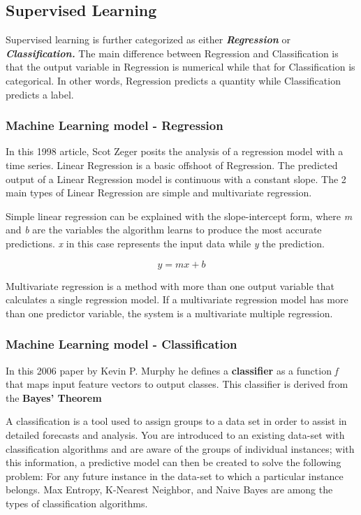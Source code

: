 \documentclass[
]{thesis-ekf}
\begin{document}
\subsection{Supervised Learning} %
Supervised learning is further categorized as  either \textbf{\textit{Regression}} or \textbf{\textit{Classification.}} The main difference between Regression and Classification is that the output variable in Regression is numerical while that for Classification is categorical. In other words, Regression predicts a quantity while  Classification predicts a label.


\subsubsection{Machine Learning model - Regression}
In this 1998 article, \cite{zeger1988regression} Scot Zeger posits the analysis of a regression model with a time series. Linear Regression is a basic offshoot of Regression. The predicted output of a Linear Regression model is continuous with a constant slope. The 2 main types of Linear Regression are simple and multivariate regression. 

Simple linear regression can be explained with the slope-intercept form, where \textit{m} and \textit{b} are the variables the algorithm learns to produce the most accurate predictions. \textit{x} in this case represents the input data while \textit{y} the prediction.

\begin{equation}
	y = m x + b
\end{equation}

Multivariate regression is a method with more than one output variable that calculates a single regression model. If a multivariate regression model has more than one predictor variable, the system is a multivariate multiple regression.


\subsubsection{Machine Learning model - Classification}

In this 2006 paper by Kevin P. Murphy \cite{murphy2006naive} he defines a \textbf{classifier} as a function \textit{f} that maps input feature vectors to output classes. This classifier is derived from the \textbf{Bayes' Theorem}

A classification is a tool used to assign groups to a data set in order to assist in detailed forecasts and analysis. You are introduced to an existing data-set with classification algorithms and are aware of the groups of individual instances; with this information, a predictive model can then be created to solve the following problem: For any future instance in the data-set to which a particular instance belongs. Max Entropy, K-Nearest Neighbor, and Naive Bayes are among the types of classification algorithms.
\end{document}
